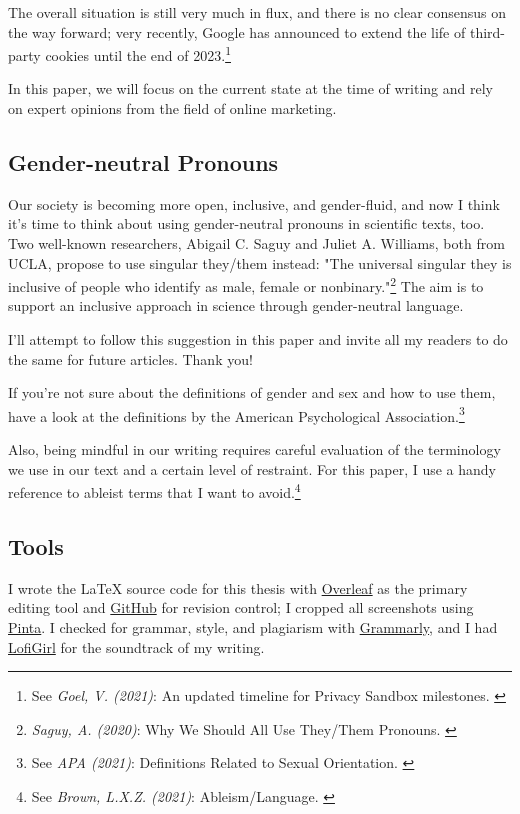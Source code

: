 The overall situation is still very much in flux, and there is no clear consensus on the way forward; very recently, Google has announced to extend the life of third-party cookies until the end of 2023.\footnote{See \textit{Goel, V. (2021)}: An updated timeline for Privacy Sandbox milestones. \cite{sandboxDelay}}

In this paper, we will focus on the current state at the time of writing and rely on expert opinions from the field of online marketing.

\subsection{Gender-neutral Pronouns}

Our society is becoming more open, inclusive, and gender-fluid, and now I think it's time to think about using gender-neutral pronouns in scientific texts, too. Two well-known researchers, Abigail C. Saguy and Juliet A. Williams, both from UCLA, propose to use singular they/them instead: "The universal singular they is inclusive of people who identify as male, female or nonbinary."\footnote{\textit{Saguy, A. (2020)}: Why We Should All Use They/Them Pronouns. \cite{pronouns}} The aim is to support an inclusive approach in science through gender-neutral language. 

I'll attempt to follow this suggestion in this paper and invite all my readers to do the same for future articles. Thank you!

If you're not sure about the definitions of gender and sex and how to use them, have a look at the definitions by the American Psychological Association.\footnote{See \textit{APA (2021)}: Definitions Related to Sexual Orientation. \cite{apaDefinitions}}

Also, being mindful in our writing requires careful evaluation of the terminology we use in our text and a certain level of restraint. For this paper, I use a handy reference to ableist terms that I want to avoid.\footnote{See \textit{Brown, L.X.Z. (2021)}: Ableism/Language. \cite{ableismLanguage}}

\subsection{Tools}

I wrote the LaTeX source code for this thesis with \href{https://www.overleaf.com/}{Overleaf} as the primary editing tool and \href{https://github.com/chfrank-cgn/Bachelor-Arbeit}{GitHub} for revision control; I cropped all screenshots using \href{https://www.pinta-project.com/}{Pinta}. I checked for grammar, style, and plagiarism with \href{https://app.grammarly.com/}{Grammarly}, and I had \href{https://www.youtube.com/watch?v=5qap5aO4i9A}{LofiGirl} for the soundtrack of my writing.

